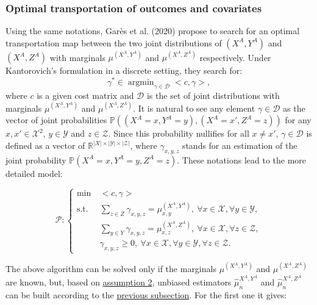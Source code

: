\hypertarget{optimal-transportation-of-outcomes-and-covariates}{%
\subsubsection{Optimal transportation of outcomes and covariates}\label{optimal-transportation-of-outcomes-and-covariates}}

Using the same notations, Garès et al. (2020) propose to search for an optimal transportation map between the two joint distributions of \((X^A,Y^A)\) and \((X^A,Z^A)\) with marginals \(\mu^{(X^A,Y^A)}\) and \(\mu^{(X^A,Z^A)}\) respectively. Under Kantorovich's formulation in a discrete setting, they search for:
\[\gamma^*\in \operatorname{argmin}_{\gamma\in \mathcal{D}} <c,\gamma>,\]
where \(c\) is a given cost matrix and \(\mathcal{D}\) is the set of joint distributions with marginals \(\mu^{(X^A,Y^A)}\) and \(\mu^{(X^A,Z^A)}\). It is natural to see any element \(\gamma\in \mathcal{D}\) as the vector of joint probabilities \(\mathbb{P}((X^A=x,Y^A=y),(X^A=x',Z^A=z))\) for any \(x,x'\in\mathcal{X}^2\), \(y\in\mathcal{Y}\) and \(z\in\mathcal{Z}\). Since this probability nullifies for all \(x\neq x'\), \(\gamma\in \mathcal{D}\) is defined as a vector of \(\mathbb{R}^{\left\lvert X \right\rvert\times \left\lvert \mathcal{Y} \right\rvert \times\left\lvert\mathcal{Z} \right\rvert }\), where \(\gamma_{x,y,z}\) stands for an estimation of the joint probability \(\mathbb{P}(X^A=x,Y^A=y,Z^A=z)\).
These notations lead to the more detailed model:

\begin{equation}
    \mathcal{P}:\left\{
    \begin{aligned}
        \min\: & <c,\gamma> \\
                \text{s.t.}\:& \sum_{z\in Z} \gamma_{x,y,z} = \mu^{(X^A,Y^A)}_{x,y}, \:\forall x\in\mathcal{X}, \forall y\in \mathcal{Y},\\
                & \sum_{y\in Y} \gamma_{x,y,z} = \mu^{(X^A,Z^A)}_{x,z}, \:\forall x\in\mathcal{X}, \forall z\in \mathcal{Z},\\
                & \gamma_{x,y,z} \geq 0,  \:\forall x\in\mathcal{X}, \forall y\in \mathcal{Y}, \forall z\in \mathcal{Z}.
    \end{aligned}\right.
\label{eq:jointkanto}
\end{equation}

The above algorithm can be solved only if the marginals \(\mu^{(X^A,Y^A)}\) and \(\mu^{(X^A,Z^A)}\) are known, but, based on \protect\hyperlink{optt}{assumption 2}, unbiased estimators \(\hat{\mu}^{X^A,Y^A}_n\) and \(\hat{\mu}^{X^A,Z^A}_n\) can be built according to the \protect\hyperlink{optt}{previous subsection}. For the first one it gives:

